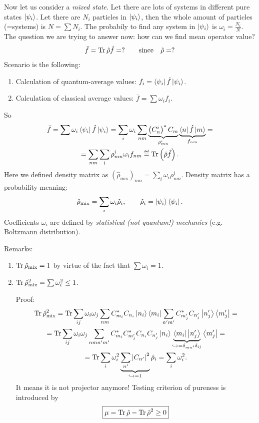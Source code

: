 Now let us consider a \textit{mixed state}. Let there are lots of systems in different pure states $\left\lvert {\psi_i} \right\rangle$. Let there are $N_i$ particles in $\left\lvert {\psi_i} \right\rangle$, then the whole amount of particles (=systems) is $N = \sum N_i$. The probabily to find any system in $\left\lvert {\psi_i} \right\rangle$ is $\omega_i = \frac{N_i}{N}$. The question we are trying to answer now: how can we find mean operator value?
\begin{equation}
	\bar{f} = \operatorname{Tr} \hat{\rho} \hat{f} = ? \qquad \text{since} \quad \hat{\rho} = ? 
\end{equation}
Scenario is the following:
\begin{enumerate}
	\item Calculation of quantum-average values: $f_i = \left\langle {\psi_i} \right\rvert \hat{f} \left\lvert {\psi_i} \right\rangle$.
	\item Calculation of classical average values: $\bar{f} = \sum \omega_i f_i$.
\end{enumerate}
So
\begin{multline}
	\bar{f} = \sum \omega_i \bra{\psi_i} \hat{f} \ket{\psi_i} = \sum_i \omega_i \sum_{nm} \underbrace{\left( C_n^i \right)^* C_m}_{\rho_{mn}^i} \underbrace{\bra{n} \hat{f} \ket{m}}_{f_{nm}} = \\
	= \sum_{nm} \sum_i \rho_{mn}^i \omega_i f_{nm} \myeq \Tr \left( \hat{\rho} \hat{f} \right).
\end{multline}
Here we defined density matrix as $\left( \hat{\rho}_{\text{mix}} \right)_{mn} = \sum_i \omega_i \rho_{mn}^i$. Density matrix has a probability meaning:
\begin{equation}
	\hat{\rho}_{\text{mix}} = \sum_i \omega_i \hat{\rho}_i, \qquad \hat{\rho}_i = \left\lvert {\psi_i} \right\rangle \left\langle {\psi_i} \right\rvert.
\end{equation}
Coefficients $\omega_i$ are defined by \textit{statistical (not quantum!) mechanics} (e.g. Boltzmann distribution).

Remarks:
\begin{enumerate}
	\item $\operatorname{Tr} \hat{\rho}_{\text{mix}} = 1$ by virtue of the fact that $\sum \omega_i = 1$.
	\item $\operatorname{Tr} \hat{\rho}_{\text{mix}}^2 = \sum \omega_i^2 \le 1$. 
	
	Proof:
	\begin{multline}
		\operatorname{Tr} \hat{\rho}_{\text{mix}}^2 = \operatorname{Tr} \sum_{ij} \omega_i \omega_j \sum_{n m} C^*_{m_i} C_{n_i} \left\lvert {n_i} \right\rangle \left\langle {m_i} \right\rvert \sum_{n' m'} C^*_{m_j'} C_{n_j'} \left\lvert {n_j'} \right\rangle \left\langle {m_j'} \right\rvert = \\ = \operatorname{Tr}
		\sum_{ij} \omega_i \omega_j \sum_{nmn'm'} C_{m_i}^* C^*_{m_j'}C_{n_i} C_{n_j'} \left\lvert {n_i} \right\rangle \underbrace{\left\langle {m_i} \right\rvert \left\lvert {n_j'} \right\rangle}_{\hookrightarrow=\delta_{mn'} \delta_{ij}} \left\langle {m_j'} \right\rvert = \\ = \operatorname{Tr} \sum_i \omega_i^2  \underbrace{\sum_{n'} \left|C_{n'}\right|^2}_{\hookrightarrow = 1} \hat{\rho}_i = \sum_i \omega_i^2.
	\end{multline}
	It means it is not projector anymore! Testing criterion of pureness is introduced by
	\begin{equation}
		\boxed{\mu = \operatorname{Tr} \hat{\rho} - \operatorname{Tr} \hat{\rho}^2 \ge 0}
	\end{equation}
\end{enumerate}

